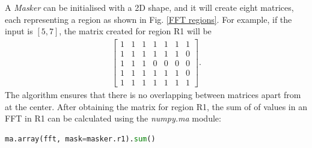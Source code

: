 \documentclass[conference]{IEEEtran}
\begin{document}
A \textit{Masker} can be initialised with a 2D shape, and it will create eight matrices, each representing a region as shown in Fig. \ref{FFT regions}. For example, if the input is $[5, 7]$, the matrix created for region R1 will be
\begin{align*}
\begin{bmatrix}
1 & 1 & 1 & 1 & 1 & 1 & 1\\
1 & 1 & 1 & 1 & 1 & 1 & 0\\
1 & 1 & 1 & 0 & 0 & 0 & 0\\
1 & 1 & 1 & 1 & 1 & 1 & 0\\
1 & 1 & 1 & 1 & 1 & 1 & 1
\end{bmatrix}.
\end{align*}
The algorithm ensures that there is no overlapping between matrices apart from at the center. After obtaining the matrix for region R1, the sum of of values in an FFT in R1 can be calculated using the \textit{numpy.ma} module:
\begin{lstlisting}[language=Python]
    ma.array(fft, mask=masker.r1).sum()
\end{lstlisting}
\end{document}
